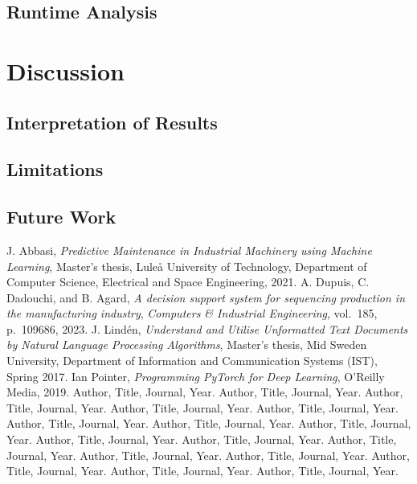 \documentclass[12pt,a4paper]{report}
\begin{document}
\section{Runtime Analysis}

\chapter{Discussion}
\section{Interpretation of Results}
\section{Limitations}
\section{Future Work}


\begin{thebibliography}{99}
J. Abbasi, \textit{Predictive Maintenance in Industrial Machinery using Machine Learning}, 
Master’s thesis, Luleå University of Technology, Department of Computer Science, Electrical and Space Engineering, 2021.
A. Dupuis, C. Dadouchi, and B. Agard, 
        \textit{A decision support system for sequencing production in the manufacturing industry},
\textit{Computers \& Industrial Engineering}, vol.~185, p.~109686, 2023. 
 J. Lindén, 
    \textit{Understand and Utilise Unformatted Text Documents by Natural Language Processing Algorithms}, 
    Master’s thesis, Mid Sweden University, Department of Information and Communication Systems (IST), Spring 2017.
 Ian Pointer,
\textit{Programming PyTorch for Deep Learning},
O'Reilly Media, 2019.
 Author, Title, Journal, Year.
 Author, Title, Journal, Year.
 Author, Title, Journal, Year.
 Author, Title, Journal, Year.
 Author, Title, Journal, Year.
 Author, Title, Journal, Year.
 Author, Title, Journal, Year.
 Author, Title, Journal, Year.
 Author, Title, Journal, Year.
 Author, Title, Journal, Year.
 Author, Title, Journal, Year.
 Author, Title, Journal, Year.
 Author, Title, Journal, Year.
 Author, Title, Journal, Year.
 Author, Title, Journal, Year.
 Author, Title, Journal, Year.
\end{thebibliography}
\end{document}
